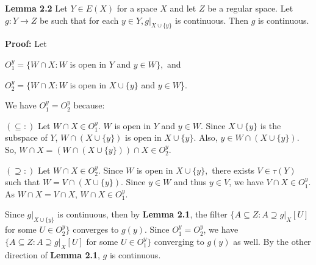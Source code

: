 \documentclass{article}
\begin{document}
\textbf{Lemma 2.2 } Let $Y\in E(X)$ for a space $X$ and let $Z$ be a regular space. Let $g:Y\rightarrow Z$ be such that for each $y\in Y, g|_{X\cup \{y\}}$ is continuous. Then $g$ is continuous.

\vskip 15pt

\textbf{Proof: } Let 
\begin{center}
$O_1^y=\{W\cap X: W$ is open in $Y$ and $y\in W\},$ and 

$O_2^y=\{W\cap X: W$ is open in $X\cup \{y\}$ and $y\in W$\}. 
\end{center}


We have $O_1^y=O_2^y$ because: 

\vskip 5pt
$(\subseteq:) $ Let $W\cap X \in O_1^y$. $W$ is open in $Y$ and $y\in W.$ Since $X\cup \{y\}$ is the subspace of $Y$, $W\cap (X\cup \{y\})$ is open in $X\cup \{y\}$. Also, $y\in W\cap (X\cup \{y\}).$ So, $W\cap X=\left(W\cap \left(X\cup\{y\}\right)\right)\cap X \in O_2^y$.


$(\supseteq:)$ Let $W\cap X\in O_2^y$. Since $W$ is open in $X\cup \{y\},$ there exists $V\in \tau(Y)$ such that $W=V\cap (X\cup \{y\})$. Since $y\in W$ and thus $y\in V$, we have $V\cap X \in O_1^y$. As $W\cap X=V\cap X$, $W\cap X \in O_1^y$. 


\vskip 20pt

Since $g|_{X\cup \{y\}}$ is continuous, then by \textbf{Lemma 2.1}, the filter $\{A\subseteq Z: A \supseteq g|_X [U]$ for some $U\in O_2^y\}$ converges
 to $g(y)$. Since $O_1^y=O_2^y$, we have $\{A\subseteq Z: A\supseteq g|_X [U]$ for some $U\in O_1^y\}$ converging to $g(y)$ as well. By the other direction of \textbf{Lemma 2.1}, $g$ is continuous.
\end{document}
